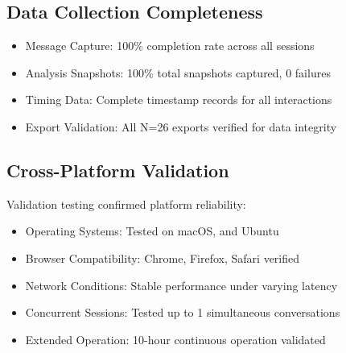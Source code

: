 \documentclass[11pt,letterpaper]{article}
\newcommand{\exponedataTotalSessionsRaw}{26}
\newcommand{\exponedataTotalSessions}{N=\exponedataTotalSessionsRaw}
\begin{document}
\subsection{Data Collection Completeness}

\begin{itemize}
    \item Message Capture: 100\% completion rate across all sessions
    \item Analysis Snapshots: 100\% total snapshots captured, 0 failures
    \item Timing Data: Complete timestamp records for all interactions
    \item Export Validation: All \exponedataTotalSessions{} exports verified for data integrity
\end{itemize}

\subsection{Cross-Platform Validation}

Validation testing confirmed platform reliability:

\begin{itemize}
    \item Operating Systems: Tested on macOS, and Ubuntu
    \item Browser Compatibility: Chrome, Firefox, Safari verified
    \item Network Conditions: Stable performance under varying latency
    \item Concurrent Sessions: Tested up to 1 simultaneous conversations
    \item Extended Operation: 10-hour continuous operation validated
\end{itemize}
\end{document}
